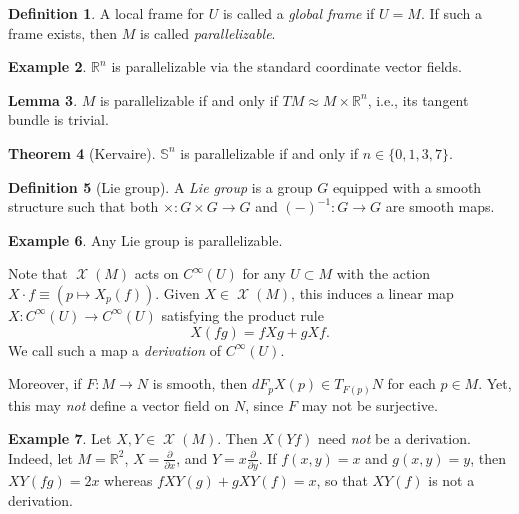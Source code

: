 \documentclass[10pt,letterpaper,cm]{nupset}
\theoremstyle{definition}
\newtheorem{definition}{Definition}[subsection]
\newtheorem{exmp}[definition]{Example}
\theoremstyle{theorem}
\newtheorem{theorem}[definition]{Theorem}
\newtheorem{lemma}[definition]{Lemma}
\theoremstyle{remark}
\newcommand{\R}{\mathbb R}
\renewcommand{\S}{\mathbb S}
\newcommand{\1}{\mathbf{1}}
\newcommand{\0}{\vec 0}
\DeclareMathOperator{\vf}{\mathscr{X}}
\begin{document}
\begin{definition}
A  local frame for $U$ is called a \textit{global frame} if $U =M$. If such a frame exists, then $M$ is called \textit{parallelizable}.
\end{definition}

\begin{exmp}
$\R^n$ is parallelizable via the standard coordinate vector fields.
\end{exmp}

\begin{lemma}
$M$ is parallelizable if and only if $TM \approx M \times \R^n$, i.e., its tangent bundle is trivial.
\end{lemma}

\begin{theorem}[Kervaire]
$\S^n$ is parallelizable if and only if $n\in \{0, 1, 3, 7\}$.
\end{theorem}

\begin{definition}[Lie group]
A  \textit{Lie group} is a group $G$ equipped with a smooth structure such that both $\times : G \times G \to G$ and $\left({-}\right)^{-1} : G \to G$ are smooth maps.
\end{definition}

\begin{exmp}
Any Lie group is parallelizable. 
\end{exmp}

\medskip

Note that $\vf(M)$ acts on $C^{\infty}(U)$ for any $U \subset M$ with the action $X \cdot f \equiv \left(p \mapsto X_p(f)\right)$. Given $X \in \vf(M)$, this induces a linear map $X : C^{\infty}(U) \to C^{\infty}(U)$ satisfying the product rule $$X(fg) = fXg  + gXf.$$ We call such a map a \textit{derivation} of $C^{\infty}(U)$.

\medskip

 Moreover, if $F: M \to N$ is smooth, then $dF_pX(p) \in T_{F(p)}N$ for each $p \in M$. Yet, this may \emph{not} define a vector field on $N$, since $F$ may not be surjective.


\begin{exmp}
Let $X, Y \in \vf(M)$. Then $X(Yf)$ need \emph{not} be a derivation. Indeed, let $M= \R^2$, $X= \frac{\partial}{\partial{x}}$, and $Y = x \frac{\partial}{\partial{y}}$. If $f(x,y)=x$ and $g(x, y) = y$, then $XY(fg) = 2x$ whereas $fXY(g) + gXY(f) = x$, so that $XY(f)$ is not a derivation.
\end{exmp}
\end{document}
